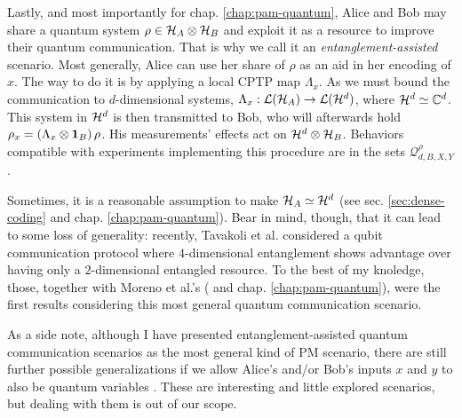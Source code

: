             Lastly, and most importantly for chap. \ref{chap:pam-quantum}, Alice and Bob may share a quantum system $\rho \in \mathcal{H}_A \otimes \mathcal{H}_B$ and exploit it as a resource to improve their quantum communication. That is why we call it an \emph{entanglement-assisted} scenario. Most generally, Alice can use her share of $\rho$ as an aid in her encoding of $x$. The way to do it is by applying a local CPTP map $\Lambda_x$. As we must bound the communication to $d$-dimensional systems, $\Lambda_x : \mathcal{L}(\mathcal{H}_A) \rightarrow \mathcal{L}(\mathcal{H}^{d})$, where $\mathcal{H}^{d} \simeq \mathbb{C}^d$. This system in $\mathcal{H}^{d}$ is then transmitted to Bob, who will afterwards hold $\rho_x = \left( \Lambda_x \otimes \mathbf{1}_B \right) \rho$. His measurements' effects act on $\mathcal{H}^{d} \otimes \mathcal{H}_B$. Behaviors compatible with experiments implementing this procedure are in the sets $\mathcal{Q}^\rho_{d,B,X,Y}$.
            
            Sometimes, it is a reasonable assumption to make $\mathcal{H}_A \simeq \mathcal{H}^{d}$ (see sec. \ref{sec:dense-coding} and chap. \ref{chap:pam-quantum}). Bear in mind, though, that it can lead to some loss of generality: recently, Tavakoli et al. \cite{tavakoli_eapam_2021} considered a qubit communication protocol where $4$-dimensional entanglement shows advantage over having only a $2$-dimensional entangled resource. To the best of my knoledge, those, together with Moreno et al.'s (\cite{moreno_pamdense_2021} and chap. \ref{chap:pam-quantum}), were the first results considering this most general quantum communication scenario.
            
            As a side note, although I have presented entanglement-assisted quantum communication scenarios as the most general kind of PM scenario, there are still further possible generalizations if we allow Alice's and/or Bob's inputs $x$ and $y$ to also be quantum variables \cite{guerini_distributed_2019}. These are interesting and little explored scenarios, but dealing with them is out of our scope.
            
